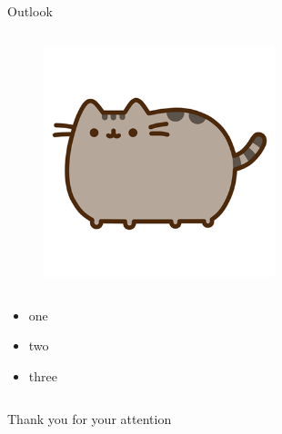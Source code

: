 \begin{columnframe}{Outlook}
    \begin{column}{0.5\textwidth}
        \begin{figure}
            \centering
            \includegraphics[width=0.6\textwidth, frame]{images/pusheen.png}
        \end{figure}
    \end{column}
    \begin{column}{0.5\textwidth}
        \begin{itemize}
            \item one
            \item two
            \item three
        \end{itemize}
    \end{column}
\end{columnframe}


\begin{frame}{}
    \centering
    \Large{Thank you for your attention}
\end{frame}


